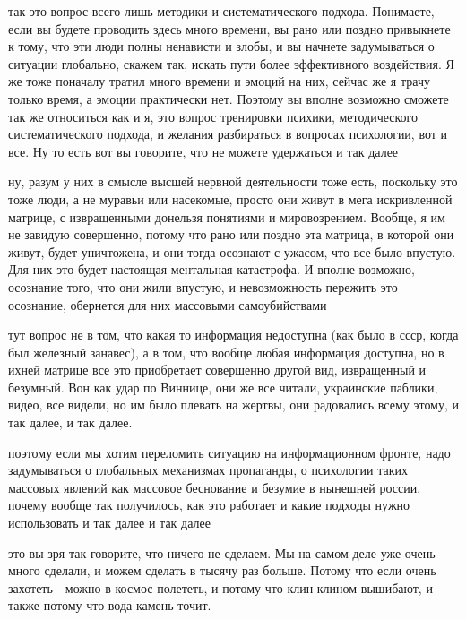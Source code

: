 
так это вопрос всего лишь методики и систематического подхода. Понимаете, если
вы будете проводить здесь много времени, вы рано или поздно привыкнете к тому,
что эти люди полны ненависти и злобы, и вы начнете задумываться о ситуации
глобально, скажем так, искать пути более эффективного воздействия. Я же тоже
поначалу тратил много времени и эмоций на них, сейчас же я трачу только время,
а эмоции практически нет. Поэтому вы вполне возможно сможете так же относиться
как и я, это вопрос тренировки психики, методического систематического подхода,
и желания разбираться в вопросах психологии, вот и все. Ну то есть вот вы
говорите, что не можете удержаться и так далее

ну, разум у них в смысле высшей нервной деятельности тоже есть, поскольку это
тоже люди, а не муравьи или насекомые, просто они живут в мега искривленной
матрице, с извращенными донельзя понятиями и мировозрением. Вообще, я им не
завидую совершенно, потому что рано или поздно эта матрица, в которой они
живут, будет уничтожена, и они тогда осознают с ужасом, что все было впустую.
Для них это будет настоящая ментальная катастрофа. И вполне возможно, осознание
того, что они жили впустую, и невозможность пережить это осознание, обернется
для них массовыми самоубийствами

тут вопрос не в том, что какая то информация недоступна (как было в ссср, когда
был железный занавес), а в том, что вообще любая информация доступна, но в
ихней матрице все это приобретает совершенно другой вид, извращенный и
безумный. Вон как удар по Виннице, они же все читали, украинские паблики,
видео, все видели, но им было плевать на жертвы, они радовались всему этому, и
так далее, и так далее.

поэтому если мы хотим переломить ситуацию на информационном фронте, надо
задумываться о глобальных механизмах пропаганды, о психологии таких массовых
явлений как массовое беснование и безумие в нынешней россии, почему вообще так
получилось, как это работает и какие подходы нужно использовать и так далее и
так далее

это вы зря так говорите, что ничего не сделаем. Мы на самом деле уже очень
много сделали, и можем сделать в тысячу раз больше. Потому что если очень
захотеть - можно в космос полететь, и потому что клин клином вышибают, и также
потому что вода камень точит.

